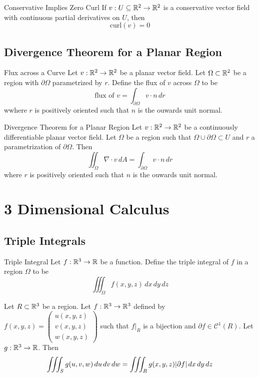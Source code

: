 \documentclass[a4paper]{article}
\begin{document}
\begin{thm}{Conservative Implies Zero Curl}{} If $v:U\subseteq\mathbb{R}^2\to\mathbb{R}^2$ is a conservative vector field with continuous partial derivatives on $U$, then $$\text{curl}(v)=0$$
\end{thm}

\subsection{Divergence Theorem for a Planar Region}
\begin{defn}{Flux across a Curve}{} Let $v:\mathbb{R}^2\to\mathbb{R}^2$ be a planar vector field. Let $\Omega\subset\mathbb{R}^2$ be a region with $\partial\Omega$ parametrized by $r$. Define the flux of $v$ across $\Omega$ to be $$\text{flux of }v=\int_{\partial\Omega}v\cdot n\,dr$$ wwhere $r$ is positively oriented such that $n$ is the ouwards unit normal. 
\end{defn}

\begin{thm}{Divergence Theorem for a Planar Region}{} Let $v:\mathbb{R}^2\to\mathbb{R}^2$ be a continuously differentiable planar vector field. Let $\Omega$ be a region such that $\Omega\cup\partial\Omega\subset U$ and $r$ a parametrization of $\partial\Omega$. Then $$\iint_{\Omega}\nabla\cdot v\,dA=\int_{\partial\Omega}v\cdot n\,dr$$ where $r$ is positively oriented such that $n$ is the ouwards unit normal. 
\end{thm}

\pagebreak

\section{3 Dimensional Calculus}
\subsection{Triple Integrals}
\begin{defn}{Triple Integral}{} Let $f:\mathbb{R}^3\to\mathbb{R}$ be a function. Define the triple integral of $f$ in a region $\Omega$ to be $$\iiint_\Omega f(x,y,z)\,dx\,dy\,dz$$
\end{defn}

\begin{thm}{}{}Let $R\subset\mathbb{R}^3$ be a region. Let $f:\mathbb{R}^3\to\mathbb{R}^3$ defined by $f(x,y,z)=\begin{pmatrix}u(x,y,z)\\v(x,y,z)\\w(x,y,z)\end{pmatrix}$ such that $f|_R$ is a bijection and $\partial f\in\mathcal{C}^1(R)$. Let $g:\mathbb{R}^3\to\mathbb{R}$. Then $$\iiint_Sg(u,v,w)\,du\,dv\,dw=\iiint_Rg(x,y,z)\abs{\partial f}\,dx\,dy\,dz$$
\end{thm}
\end{document}
